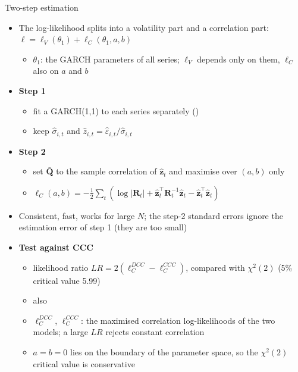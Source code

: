 \begin{frame}{Two-step estimation}
\itemsize{\footnotesize}
\begin{itemize}
    \item The log-likelihood splits into a volatility part and a correlation part: $\ell = \ell_V(\theta_1) + \ell_C(\theta_1, a, b)$
    \begin{itemize}
        \item $\theta_1$: the GARCH parameters of all series; $\ell_V$ depends only on them, $\ell_C$ also on $a$ and $b$
    \end{itemize}
    \item \textbf{Step 1}
    \begin{itemize}
        \item fit a GARCH(1,1) to each series separately ()
        \item keep $\hat\sigma_{i,t}$ and $\hat z_{i,t} = \hat\varepsilon_{i,t}/\hat\sigma_{i,t}$
    \end{itemize}
    \item \textbf{Step 2}
    \begin{itemize}
        \item set $\bar{\mathbf{Q}}$ to the sample correlation of $\hat{\mathbf{z}}_t$ and maximise over $(a, b)$ only
        \item $\ell_C(a, b) = -\frac12\sum_t\left(\log|\mathbf{R}_t| + \hat{\mathbf{z}}_t^\top\mathbf{R}_t^{-1}\hat{\mathbf{z}}_t - \hat{\mathbf{z}}_t^\top\hat{\mathbf{z}}_t\right)$
    \end{itemize}
    \item Consistent, fast, works for large $N$; the step-2 standard errors ignore the estimation error of step 1 (they are too small)
    \item \textbf{Test against CCC}
    \begin{itemize}
        \item likelihood ratio $LR = 2(\ell_C^{DCC} - \ell_C^{CCC})$, compared with $\chi^2(2)$ (5\% critical value 5.99)
        \item also 
        \item $\ell_C^{DCC}$, $\ell_C^{CCC}$: the maximised correlation log-likelihoods of the two models; a large $LR$ rejects constant correlation
        \item $a = b = 0$ lies on the boundary of the parameter space, so the $\chi^2(2)$ critical value is conservative
    \end{itemize}
\end{itemize}
\end{frame}

